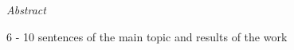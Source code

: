 
\begin{center}
{\it \large Abstract}
\vspace{0.2cm}

\begin{minipage}{0.8\textwidth}
{
6 - 10 sentences of the main topic and results of the work
}
\end{minipage}
\end{center}
\vfill
\newpage{}
